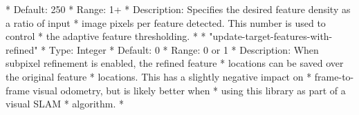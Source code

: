 \begin{DoxyVerb}
 *     Default:     250
 *     Range:       1+
 *     Description: Specifies the desired feature density as a ratio of input
 *                  image pixels per feature detected.  This number is used to control
 *                  the adaptive feature thresholding.
 *
 *   "update-target-features-with-refined"
 *     Type:        Integer
 *     Default:     0
 *     Range:       0 or 1
 *     Description: When subpixel refinement is enabled, the refined feature
 *                  locations can be saved over the original feature
 *                  locations.  This has a slightly negative impact on
 *                  frame-to-frame visual odometry, but is likely better when
 *                  using this library as part of a visual SLAM
 *                  algorithm.
 * \end{DoxyVerb}
 